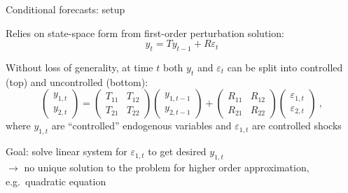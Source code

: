 \documentclass[handout,usepdftitle=false,xcolor=dvipsnames,aspectratio=169]{beamer}
\begin{document}
\begin{frame}{Conditional forecasts: setup}
  \begin{witemize}
    \item Relies on state-space form from first-order perturbation solution:
    \begin{equation}
      y_t = T y_{t-1} + R \varepsilon_t
    \end{equation}
    \item Without loss of generality, at time $t$ both $y_t$ and $\varepsilon_t$ can be split into controlled (top) and uncontrolled (bottom):
    \begin{equation}
      \begin{pmatrix} y_{1,t} \\ y_{2,t} \end{pmatrix} =
      \begin{pmatrix} T_{11} & T_{12} \\ T_{21} & T_{22} \end{pmatrix}
      \begin{pmatrix} y_{1,t-1} \\ y_{2,t-1} \end{pmatrix} +
      \begin{pmatrix} R_{11} & R_{12} \\ R_{21} & R_{22} \end{pmatrix}
      \begin{pmatrix} \varepsilon_{1,t} \\ \varepsilon_{2,t} \end{pmatrix} \ ,
    \end{equation}
    where $y_{1,t}$ are ``controlled'' endogenous variables and $\varepsilon_{1,t}$ are controlled shocks
    \item Goal: solve linear system for $\varepsilon_{1,t}$ to get desired $y_{1,t}$\\
    $\rightarrow$ no unique solution to the problem for higher order approximation, e.g.\ quadratic equation
  \end{witemize}
\end{frame}
\end{document}
